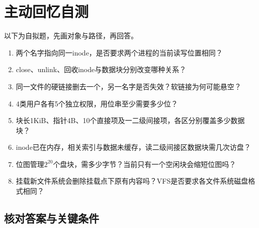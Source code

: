 \section{主动回忆自测}\label{OS04-recall}

以下为自拟题，先画对象与路径，再回答。

\begin{recallcard}[从名字一直追到数据与回收]

\begin{enumerate}
\def\labelenumi{\arabic{enumi}.}
\tightlist
\item
  两个名字指向同一inode，是否要求两个进程的当前读写位置相同？
\item
  close、unlink、回收inode与数据块分别改变哪种关系？
\item
  同一文件的硬链接删去一个，另一名字是否失效？软链接为何可能悬空？
\item
  4类用户各有5个独立权限，用位串至少需要多少位？
\item
  块长1KiB、指针4B、10个直接项及一二级间接项，各区分别覆盖多少数据块？
\item
  inode已在内存，相关索引与数据未缓存，读二级间接区数据块需几次访盘？
\item
  位图管理\(2^{20}\)个盘块，需多少字节？当前只有一个空闲块会缩短位图吗？
\item
  挂载新文件系统会删除挂载点下原有内容吗？VFS是否要求各文件系统磁盘格式相同？
\end{enumerate}

\end{recallcard}

\subsection{核对答案与关键条件}\label{OS04-recall-answers}

